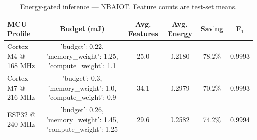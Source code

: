\begin{table}[t]
\caption{Energy-gated inference — NBAIOT. Feature counts are test-set means.}
\label{tab:energy_nbaiot}
\centering
\begin{tabular}{lccccc}
\toprule
MCU Profile & Budget (mJ) & Avg. Features & Avg. Energy & Saving & F$_1$ \\
\midrule
Cortex-M4 @ 168 MHz & {'budget': 0.22, 'memory_weight': 1.25, 'compute_weight': 1.1} & 25.0 & 0.2180 & 78.2\% & 0.9993 \\
Cortex-M7 @ 216 MHz & {'budget': 0.3, 'memory_weight': 1.0, 'compute_weight': 0.9} & 34.1 & 0.2979 & 70.2\% & 0.9993 \\
ESP32 @ 240 MHz & {'budget': 0.26, 'memory_weight': 1.45, 'compute_weight': 1.25} & 29.6 & 0.2582 & 74.2\% & 0.9994 \\
\bottomrule
\end{tabular}
\end{table}